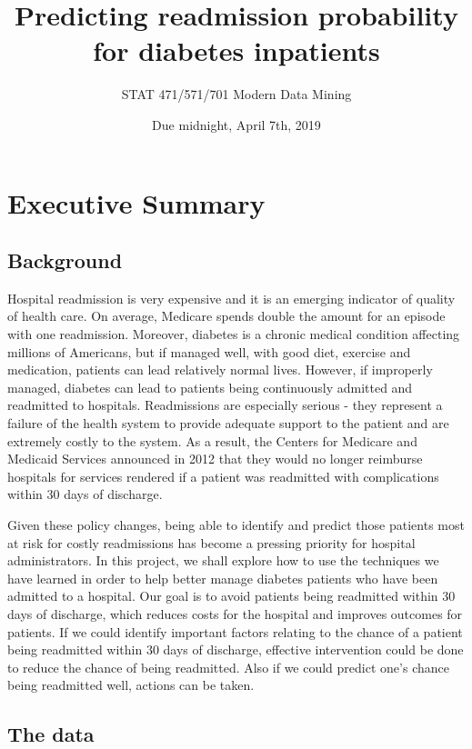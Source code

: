 \documentclass[]{article}
\title{Predicting readmission probability for diabetes inpatients}
\author{STAT 471/571/701 Modern Data Mining}
\date{Due midnight, April 7th, 2019}
\begin{document}
\maketitle

{
\setcounter{tocdepth}{4}
\tableofcontents
}
\section{Executive Summary}\label{executive-summary}

\subsection{Background}\label{background}

Hospital readmission is very expensive and it is an emerging indicator
of quality of health care. On average, Medicare spends double the amount
for an episode with one readmission. Moreover, diabetes is a chronic
medical condition affecting millions of Americans, but if managed well,
with good diet, exercise and medication, patients can lead relatively
normal lives. However, if improperly managed, diabetes can lead to
patients being continuously admitted and readmitted to hospitals.
Readmissions are especially serious - they represent a failure of the
health system to provide adequate support to the patient and are
extremely costly to the system. As a result, the Centers for Medicare
and Medicaid Services announced in 2012 that they would no longer
reimburse hospitals for services rendered if a patient was readmitted
with complications within 30 days of discharge.

Given these policy changes, being able to identify and predict those
patients most at risk for costly readmissions has become a pressing
priority for hospital administrators. In this project, we shall explore
how to use the techniques we have learned in order to help better manage
diabetes patients who have been admitted to a hospital. Our goal is to
avoid patients being readmitted within 30 days of discharge, which
reduces costs for the hospital and improves outcomes for patients. If we
could identify important factors relating to the chance of a patient
being readmitted within 30 days of discharge, effective intervention
could be done to reduce the chance of being readmitted. Also if we could
predict one's chance being readmitted well, actions can be taken.

\subsection{The data}\label{the-data}
\end{document}
